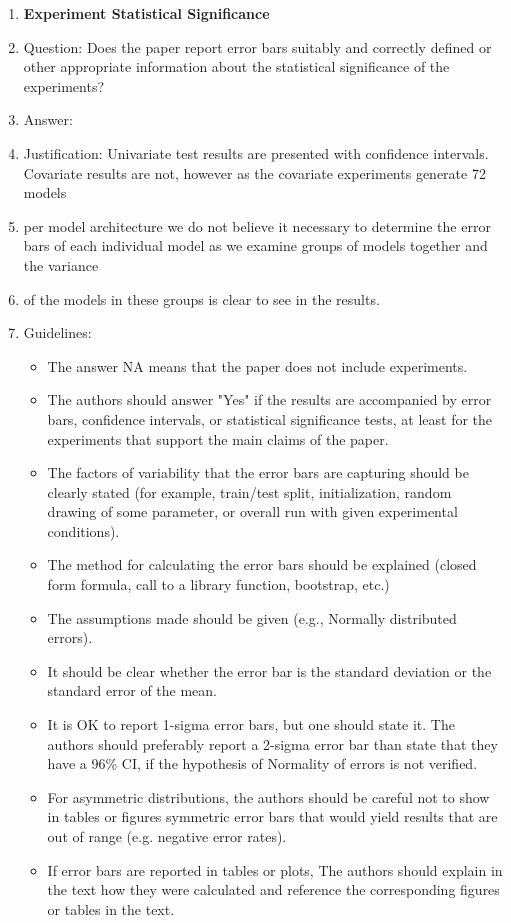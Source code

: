 \documentclass[letterpaper]{article}
\begin{document}
\begin{enumerate}
\item {\bf Experiment Statistical Significance}
    \item[] Question: Does the paper report error bars suitably and correctly defined or other appropriate information about the statistical significance of the experiments?
    \item[] Answer: \answerYes{} %
    \item[] Justification: Univariate test results are presented with confidence intervals. Covariate results are not, however as the covariate experiments generate 72 models
    \item[] per model architecture we do not believe it necessary to determine the error bars of each individual model as we examine groups of models together and the variance 
    \item[] of the models in these groups is clear to see in the results.  
    \item[] Guidelines:
    \begin{itemize}
        \item The answer NA means that the paper does not include experiments.
        \item The authors should answer "Yes" if the results are accompanied by error bars, confidence intervals, or statistical significance tests, at least for the experiments that support the main claims of the paper.
        \item The factors of variability that the error bars are capturing should be clearly stated (for example, train/test split, initialization, random drawing of some parameter, or overall run with given experimental conditions).
        \item The method for calculating the error bars should be explained (closed form formula, call to a library function, bootstrap, etc.)
        \item The assumptions made should be given (e.g., Normally distributed errors).
        \item It should be clear whether the error bar is the standard deviation or the standard error of the mean.
        \item It is OK to report 1-sigma error bars, but one should state it. The authors should preferably report a 2-sigma error bar than state that they have a 96\% CI, if the hypothesis of Normality of errors is not verified.
        \item For asymmetric distributions, the authors should be careful not to show in tables or figures symmetric error bars that would yield results that are out of range (e.g. negative error rates).
        \item If error bars are reported in tables or plots, The authors should explain in the text how they were calculated and reference the corresponding figures or tables in the text.
    \end{itemize}


\end{enumerate}
\end{document}
